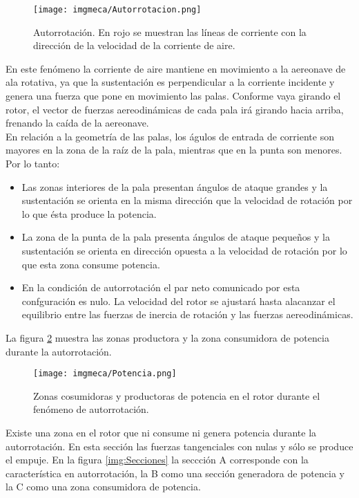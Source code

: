 \begin{figure}[H]
	\centering
		\texttt{[image: imgmeca/Autorrotacion.png]}
	\caption{Autorrotaci\'on. En rojo se muestran las l\'ineas de corriente con la direcci\'on de la velocidad de la corriente de aire.}
	\label{img:Autorrotacion}
\end{figure}


\noindent En este fen\'omeno la corriente de aire mantiene en movimiento a la aereonave de ala rotativa, ya que la sustentaci\'on es perpendicular a la corriente incidente y genera una fuerza que pone en movimiento las palas. Conforme vaya girando el rotor, el vector de fuerzas aereodin\'amicas de cada pala ir\'a girando hacia arriba, frenando la ca\'ida de la aereonave.\\

\noindent En relaci\'on a la geometr\'ia de las palas, los \'agulos de entrada de corriente son mayores en la zona de la ra\'iz de la pala, mientras que en  la punta son menores. Por lo tanto:

\begin{itemize}
\item Las zonas interiores de la pala presentan \'angulos de ataque grandes y la sustentaci\'on se orienta en la misma direcci\'on que la velocidad de rotaci\'on por lo que \'esta produce la potencia.
\item La zona de la punta de la pala presenta \'angulos de ataque peque\~{n}os y la sustentaci\'on se orienta en direcci\'on opuesta a la velocidad de rotaci\'on por lo que esta zona consume potencia.
\item En la condici\'on de autorrotaci\'on el par neto comunicado por esta confguraci\'on es nulo. La velocidad del rotor se ajustar\'a hasta alacanzar el equilibrio entre las fuerzas de inercia de rotaci\'on y las fuerzas aereodin\'amicas.
\end{itemize}
 
\noindent La figura \ref{img:Potencia} muestra las zonas productora y la zona consumidora de potencia durante la autorrotaci\'on.

\begin{figure}[H]
	\centering
	\texttt{[image: imgmeca/Potencia.png]}
	\caption{Zonas cosumidoras y productoras de potencia en el rotor durante el fen\'omeno de autorrotaci\'on.}
	\label{img:Potencia}
\end{figure}

\noindent Existe una zona en el rotor que ni consume ni genera potencia durante la autorrotaci\'on. En esta secci\'on las fuerzas tangenciales con nulas y s\'olo se produce el empuje. En la figura \ref{img:Secciones} la seccci\'on A corresponde con la caracter\'istica en autorrotaci\'on, la B como una secci\'on generadora de potencia y la C como una zona consumidora de potencia.


